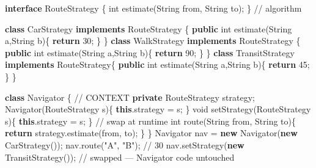 \documentclass[11pt]{article}
\newenvironment{Shaded}{\begin{snugshade}}{\end{snugshade}}
\newcommand{\BuiltInTok}[1]{\textcolor[rgb]{0.50,0.55,0.55}{#1}}
\newcommand{\CommentTok}[1]{\textcolor[rgb]{0.48,0.49,0.49}{#1}}
\newcommand{\ControlFlowTok}[1]{\textcolor[rgb]{0.99,0.74,0.29}{\textbf{#1}}}
\newcommand{\DataTypeTok}[1]{\textcolor[rgb]{0.16,0.50,0.73}{#1}}
\newcommand{\DecValTok}[1]{\textcolor[rgb]{0.96,0.45,0.00}{#1}}
\newcommand{\FunctionTok}[1]{\textcolor[rgb]{0.56,0.27,0.68}{#1}}
\newcommand{\KeywordTok}[1]{\textcolor[rgb]{0.81,0.81,0.76}{\textbf{#1}}}
\newcommand{\NormalTok}[1]{\textcolor[rgb]{0.81,0.81,0.76}{#1}}
\newcommand{\OperatorTok}[1]{\textcolor[rgb]{0.81,0.81,0.76}{#1}}
\newcommand{\StringTok}[1]{\textcolor[rgb]{0.96,0.31,0.31}{#1}}
\begin{document}
\begin{Shaded}
\begin{Highlighting}[]
\KeywordTok{interface}\NormalTok{ RouteStrategy }\OperatorTok{\{} \DataTypeTok{int} \FunctionTok{estimate}\OperatorTok{(}\BuiltInTok{String}\NormalTok{ from}\OperatorTok{,} \BuiltInTok{String}\NormalTok{ to}\OperatorTok{);} \OperatorTok{\}}      \CommentTok{// algorithm}

\KeywordTok{class}\NormalTok{ CarStrategy    }\KeywordTok{implements}\NormalTok{ RouteStrategy }\OperatorTok{\{} \KeywordTok{public} \DataTypeTok{int} \FunctionTok{estimate}\OperatorTok{(}\BuiltInTok{String}\NormalTok{ a}\OperatorTok{,}\BuiltInTok{String}\NormalTok{ b}\OperatorTok{)\{} \ControlFlowTok{return} \DecValTok{30}\OperatorTok{;} \OperatorTok{\}} \OperatorTok{\}}
\KeywordTok{class}\NormalTok{ WalkStrategy   }\KeywordTok{implements}\NormalTok{ RouteStrategy }\OperatorTok{\{} \KeywordTok{public} \DataTypeTok{int} \FunctionTok{estimate}\OperatorTok{(}\BuiltInTok{String}\NormalTok{ a}\OperatorTok{,}\BuiltInTok{String}\NormalTok{ b}\OperatorTok{)\{} \ControlFlowTok{return} \DecValTok{90}\OperatorTok{;} \OperatorTok{\}} \OperatorTok{\}}
\KeywordTok{class}\NormalTok{ TransitStrategy }\KeywordTok{implements}\NormalTok{ RouteStrategy}\OperatorTok{\{} \KeywordTok{public} \DataTypeTok{int} \FunctionTok{estimate}\OperatorTok{(}\BuiltInTok{String}\NormalTok{ a}\OperatorTok{,}\BuiltInTok{String}\NormalTok{ b}\OperatorTok{)\{} \ControlFlowTok{return} \DecValTok{45}\OperatorTok{;} \OperatorTok{\}} \OperatorTok{\}}

\KeywordTok{class}\NormalTok{ Navigator }\OperatorTok{\{}                                  \CommentTok{// CONTEXT}
    \KeywordTok{private}\NormalTok{ RouteStrategy strategy}\OperatorTok{;}
    \FunctionTok{Navigator}\OperatorTok{(}\NormalTok{RouteStrategy s}\OperatorTok{)\{} \KeywordTok{this}\OperatorTok{.}\FunctionTok{strategy} \OperatorTok{=}\NormalTok{ s}\OperatorTok{;} \OperatorTok{\}}
    \DataTypeTok{void} \FunctionTok{setStrategy}\OperatorTok{(}\NormalTok{RouteStrategy s}\OperatorTok{)\{} \KeywordTok{this}\OperatorTok{.}\FunctionTok{strategy} \OperatorTok{=}\NormalTok{ s}\OperatorTok{;} \OperatorTok{\}}   \CommentTok{// swap at runtime}
    \DataTypeTok{int} \FunctionTok{route}\OperatorTok{(}\BuiltInTok{String}\NormalTok{ from}\OperatorTok{,} \BuiltInTok{String}\NormalTok{ to}\OperatorTok{)\{} \ControlFlowTok{return}\NormalTok{ strategy}\OperatorTok{.}\FunctionTok{estimate}\OperatorTok{(}\NormalTok{from}\OperatorTok{,}\NormalTok{ to}\OperatorTok{);} \OperatorTok{\}}
\OperatorTok{\}}
\NormalTok{Navigator nav }\OperatorTok{=} \KeywordTok{new} \FunctionTok{Navigator}\OperatorTok{(}\KeywordTok{new} \FunctionTok{CarStrategy}\OperatorTok{());}
\NormalTok{nav}\OperatorTok{.}\FunctionTok{route}\OperatorTok{(}\StringTok{"A"}\OperatorTok{,} \StringTok{"B"}\OperatorTok{);}                  \CommentTok{// 30}
\NormalTok{nav}\OperatorTok{.}\FunctionTok{setStrategy}\OperatorTok{(}\KeywordTok{new} \FunctionTok{TransitStrategy}\OperatorTok{());} \CommentTok{// swapped — Navigator code untouched}
\end{Highlighting}
\end{Shaded}
\end{document}

